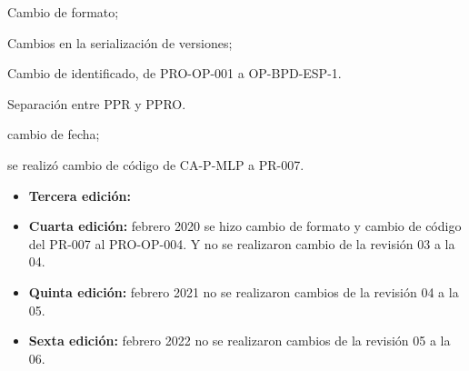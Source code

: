 \begin{changelog}[simple, sectioncmd=\subsection*,label=changelog-2.2]
	
	\begin{version}[v=2.1, date=2023--01, author=Pablo E. Alanis]
			\item Cambio de formato;
			\item Cambios en la serialización de versiones;
			\item Cambio de identificado, de PRO-OP-001 a OP-BPD-ESP-1.
			\item Separación entre PPR y PPRO.
	\end{version}

	\begin{version}[v=1.3, date=2022-05, author=Alonso M.]
		\item cambio de fecha;
		\item se realizó cambio de código de CA-P-MLP a PR-007. 
	\end{version}

\end{changelog}

\begin{itemize}
	\item \textbf{Tercera edición:} 
	\item \textbf{Cuarta edición:} febrero 2020 se hizo cambio de formato y cambio de código del PR-007 al PRO-OP-004. Y no se realizaron cambio de la revisión 03 a la 04.
	\item \textbf{Quinta edición:} febrero 2021 no se realizaron cambios de la revisión 04 a la 05.
	\item \textbf{Sexta edición:} febrero 2022 no se realizaron cambios de la revisión 05 a la 06.
\end{itemize}
